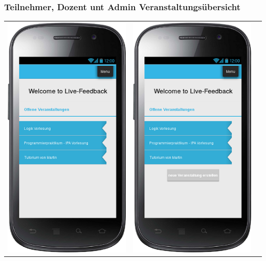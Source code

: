 \documentclass[german,a4paper]{beamer}
\begin{document}
\begin{frame}
\frametitle{Teilnehmer, Dozent unt Admin Veranstaltungs\"{u}bersicht}
\begin{tabular}{ccc}
  \includegraphics[height=0.75\textheight]{./mockups/mockup_welcome_teilnehmer.png}
  &
  \includegraphics[height=0.75\textheight]{./mockups/mockup_welcome_dozent.png}

\end{tabular}
\end{frame}
\end{document}
